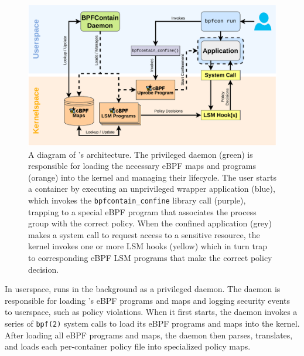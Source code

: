 \begin{figure}[htpb]
  \centering
  \includegraphics[width=1\linewidth]{figs/architecture.pdf}
  \caption{
    A diagram of \bpfcontain{}'s architecture. The privileged daemon (green) is
    responsible for loading the necessary eBPF maps and programs (orange) into
    the kernel and managing their lifecycle. The user starts a container by
    executing an unprivileged wrapper application (blue), which invokes the
    \texttt{bpfcontain\_confine} library call (purple), trapping to a special
    eBPF program that associates the process group with the correct policy.
    When the confined application (grey) makes a system call to request access
    to a sensitive resource, the kernel invokes one or more LSM hooks (yellow)
    which in turn trap to corresponding eBPF LSM programs that make the correct
    policy decision.
  }%
  \label{fig:architecture}
\end{figure}


In userspace, \bpfcontain{} runs in the background as a privileged daemon.  The
daemon is responsible for loading \bpfcontain{}'s eBPF programs and maps and
logging security events to userspace, such as policy violations.  When it first
starts, the daemon invokes a series of \texttt{bpf(2)} system calls to load its
eBPF programs and maps into the kernel. After loading all eBPF programs and
maps, the daemon then parses, translates, and loads each per-container policy
file into specialized policy maps.

